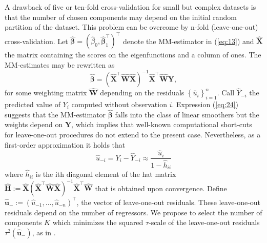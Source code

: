 \documentclass[11pt]{article}
\begin{document}
A drawback of five or ten-fold cross-validation for small but complex datasets is that the number of chosen components may depend on the initial random partition of the dataset. This problem can be overcome by n-fold (leave-one-out) cross-validation. 
Let $\widehat{\boldsymbol{\beta}} =   (\widehat{\beta}_0, \widehat{\boldsymbol{\beta}}_1^{\top} )^{\top}$ denote the MM-estimator in (\ref{eq:13}) and $\widehat{\mathbf{X}}$ the matrix containing the scores on the eigenfunctions and a column of ones. The MM-estimates may be rewritten as
\begin{equation}
\label{eq:24}
\widehat{\boldsymbol{\beta}} =  \left( \widehat{\mathbf{X}}^{\top} \mathbf{\widehat{W}} \widehat{\mathbf{X}} \right)^{-1} \widehat{\mathbf{X}}^{\top} \mathbf{\widehat{W}} \mathbf{Y},
\end{equation}
for some weighting matrix $\mathbf{\widehat{W}}$ depending on the residuals $\left\{\widehat{u}_i \right\}_{i=1}^n$. Call $\widehat{Y}_{-i}$ the predicted value of $Y_i$ computed without observation $i$. Expression (\ref{eq:24}) suggests that the MM-estimator $\widehat{\boldsymbol{\beta}}$ falls into the class of linear smoothers but the weights depend on $\mathbf{Y}$, which implies that well-known computational short-cuts for leave-one-out procedures do not extend to the present case. Nevertheless, as a first-order approximation it holds that
\begin{equation}
\widehat{u}_{-i} = Y_i - \widehat{Y}_{-i} \approx \frac{\widehat{u}_i}{1-\widehat{h}_{ii}}
\end{equation}
where $\widehat{h}_{ii}$ is the ith diagonal element of the hat matrix $\widehat{\mathbf{H}} := \widehat{\mathbf{X}}  ( \widehat{\mathbf{X}}^{\top} \mathbf{\widehat{W}} \widehat{\mathbf{X}})^{-1} \widehat{\mathbf{X}}^{\top} \mathbf{\widehat{W}} $ that is obtained upon convergence. Define $\widehat{\mathbf{u}}_{-} := \left( \widehat{u}_{-1}, \ldots, \widehat{u}_{-n} \right)^{\top}$, the vector of leave-one-out residuals. These leave-one-out residuals depend on the number of regressors. We propose to select the number of components $K$ which minimizes the squared $\tau$-scale of the leave-one-out residuals $\tau^2\left(\widehat{\mathbf{u}}_{-} \right)$, as in \cite{maronna2011robust}. 
\end{document}
